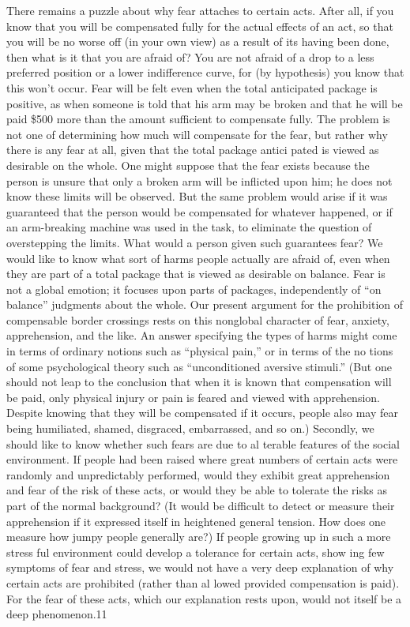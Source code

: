 \documentclass[11pt,openany]{book}
\begin{document}
There remains a puzzle about why fear attaches to certain acts. After all, if you know that you will be compensated fully for the actual effects of an act, so that you will be no worse off (in your own view) as a result of its having been done, then what is it that you are afraid of? You are not afraid of a drop to a less preferred position or a lower indifference curve, for (by hypothesis) you know that this won't occur. Fear will be felt even when the total anticipated package is positive, as when someone is told that his arm may be broken and that he will be paid \$500 more than the amount sufficient to compensate fully. The problem is not one of determining how much will compensate for the fear, but rather why there is any fear at all, given that the total package antici pated is viewed as desirable on the whole. One might suppose that the fear exists because the person is unsure that only a broken arm will be inflicted upon him; he does not know these limits will be observed. But the same problem would arise if it was guaranteed that the person would be compensated for whatever happened, or if an arm-breaking machine was used in the task, to eliminate the question of overstepping the limits. What would a person given such guarantees fear? We would like to know what sort of harms people actually are afraid of, even when they are part of a total package that is viewed as desirable on balance. Fear is not a global emotion; it focuses upon parts of packages, independently of ``on balance'' judgments about the whole. Our present argument for the prohibition of compensable border crossings rests on this nonglobal character of fear, anxiety, apprehension, and the like. An answer specifying the types of harms might come in terms of ordinary notions such as ``physical pain,'' or in terms of the no tions of some psychological theory such as ``unconditioned aversive stimuli.'' (But one should not leap to the conclusion that when it is known that compensation will be paid, only physical injury or pain is feared and viewed with apprehension. Despite knowing that they will be compensated if it occurs, people also may fear being humiliated, shamed, disgraced, embarrassed, and so on.) Secondly, we should like to know whether such fears are due to al terable features of the social environment. If people had been raised where great numbers of certain acts were randomly and unpredictably performed, would they exhibit great apprehension and fear of the risk of these acts, or would they be able to tolerate the risks as part of the normal background? (It would be difficult to detect or measure their apprehension if it expressed itself in heightened general tension. How does one measure how jumpy people generally are?) If people growing up in such a more stress ful environment could develop a tolerance for certain acts, show ing few symptoms of fear and stress, we would not have a very deep explanation of why certain acts are prohibited (rather than al lowed provided compensation is paid). For the fear of these acts, which our explanation rests upon, would not itself be a deep phenomenon.11 
\end{document}
